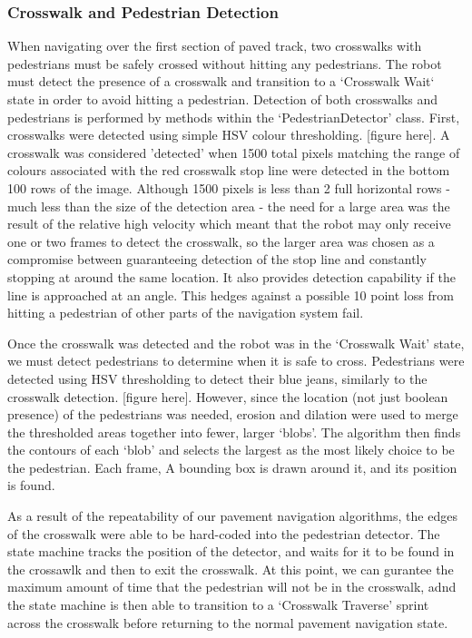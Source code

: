 \documentclass[titlepage]{article}
\begin{document}
        \subsubsection{Crosswalk and Pedestrian Detection}
            When navigating over the first section of paved track, two crosswalks with pedestrians must be safely crossed without hitting any pedestrians. The robot must detect the presence of a crosswalk and transition to a `Crosswalk Wait` state in order to avoid hitting a pedestrian. Detection of both crosswalks and pedestrians is performed by methods within the `PedestrianDetector' class. First, crosswalks were detected using simple HSV colour thresholding. [figure here]. A crosswalk was considered 'detected' when 1500 total pixels matching the range of colours associated with the red crosswalk stop line were detected in the bottom 100 rows of the image. Although 1500 pixels is less than 2 full horizontal rows - much less than the size of the detection area - the need for a large area was the result of the relative high velocity which meant that the robot may only receive one or two frames to detect the crosswalk, so the larger area was chosen as a compromise between guaranteeing detection of the stop line and constantly stopping at around the same location. It also provides detection capability if the line is approached at an angle. This hedges against a possible 10 point loss from hitting a pedestrian of other parts of the navigation system fail.

            Once the crosswalk was detected and the robot was in the `Crosswalk Wait' state, we must detect pedestrians to determine when it is safe to cross. Pedestrians were detected using HSV thresholding to detect their blue jeans, similarly to the crosswalk detection. [figure here]. However, since the location (not just boolean presence) of the pedestrians was needed, erosion and dilation were used to merge the thresholded areas together into fewer, larger `blobs'. The algorithm then finds the contours of each `blob' and selects the largest as the most likely choice to be the pedestrian. Each frame, A bounding box is drawn around it, and its position is found.

            As a result of the repeatability of our pavement navigation algorithms, the edges of the crosswalk were able to be hard-coded into the pedestrian detector. The state machine tracks the position of the detector, and waits for it to be found in the crossawlk and then to exit the crosswalk. At this point, we can gurantee the maximum amount of time that the pedestrian will not be in the crosswalk, adnd the state machine is then able to transition to a `Crosswalk Traverse' sprint across the crosswalk before returning to the normal pavement navigation state. 
            
\end{document}
